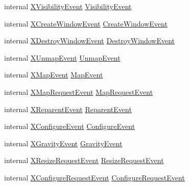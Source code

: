 \begin{DoxyCompactItemize}
\item 
internal \hyperlink{struct_tao_1_1_platform_1_1_x11_1_1_x_visibility_event}{XVisibilityEvent} \hyperlink{struct_tao_1_1_platform_1_1_x11_1_1_x_event_a25bf163da670f4aca331c592e6703ad6}{VisibilityEvent}
\item 
internal \hyperlink{struct_tao_1_1_platform_1_1_x11_1_1_x_create_window_event}{XCreateWindowEvent} \hyperlink{struct_tao_1_1_platform_1_1_x11_1_1_x_event_a8789b53b13f22648921b32c5aa980ebb}{CreateWindowEvent}
\item 
internal \hyperlink{struct_tao_1_1_platform_1_1_x11_1_1_x_destroy_window_event}{XDestroyWindowEvent} \hyperlink{struct_tao_1_1_platform_1_1_x11_1_1_x_event_a232cbc90617d2dcc21ef41a94962a273}{DestroyWindowEvent}
\item 
internal \hyperlink{struct_tao_1_1_platform_1_1_x11_1_1_x_unmap_event}{XUnmapEvent} \hyperlink{struct_tao_1_1_platform_1_1_x11_1_1_x_event_a6b0d6275dfeb6ca31babcaf70978304b}{UnmapEvent}
\item 
internal \hyperlink{struct_tao_1_1_platform_1_1_x11_1_1_x_map_event}{XMapEvent} \hyperlink{struct_tao_1_1_platform_1_1_x11_1_1_x_event_adc232db1e5c6dae079ac74cdcd54cf81}{MapEvent}
\item 
internal \hyperlink{struct_tao_1_1_platform_1_1_x11_1_1_x_map_request_event}{XMapRequestEvent} \hyperlink{struct_tao_1_1_platform_1_1_x11_1_1_x_event_a640df01f825ec17d1b9a8d13ec40447b}{MapRequestEvent}
\item 
internal \hyperlink{struct_tao_1_1_platform_1_1_x11_1_1_x_reparent_event}{XReparentEvent} \hyperlink{struct_tao_1_1_platform_1_1_x11_1_1_x_event_a156d7713d8b044c2ce402be0c8eab110}{ReparentEvent}
\item 
internal \hyperlink{struct_tao_1_1_platform_1_1_x11_1_1_x_configure_event}{XConfigureEvent} \hyperlink{struct_tao_1_1_platform_1_1_x11_1_1_x_event_a508f87fdbc35c4dcfb765677da4d88f8}{ConfigureEvent}
\item 
internal \hyperlink{struct_tao_1_1_platform_1_1_x11_1_1_x_gravity_event}{XGravityEvent} \hyperlink{struct_tao_1_1_platform_1_1_x11_1_1_x_event_ab3a1bf9716e55c9836a0f949a919c782}{GravityEvent}
\item 
internal \hyperlink{struct_tao_1_1_platform_1_1_x11_1_1_x_resize_request_event}{XResizeRequestEvent} \hyperlink{struct_tao_1_1_platform_1_1_x11_1_1_x_event_a289c3c6f7c98a098ac7d5358ce680890}{ResizeRequestEvent}
\item 
internal \hyperlink{struct_tao_1_1_platform_1_1_x11_1_1_x_configure_request_event}{XConfigureRequestEvent} \hyperlink{struct_tao_1_1_platform_1_1_x11_1_1_x_event_a6cf87b10fd4c8d72fa5db542e58dce7f}{ConfigureRequestEvent}

\end{DoxyCompactItemize}
